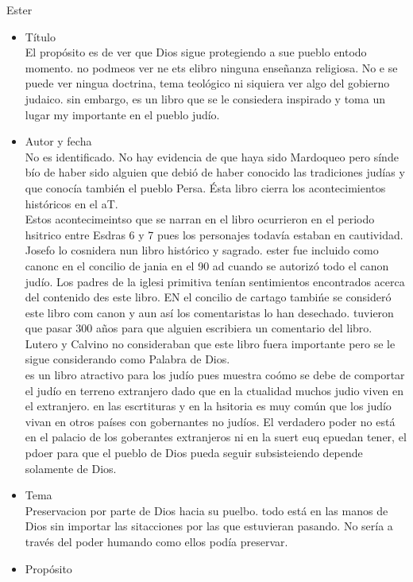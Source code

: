 \documentclass[12pt]{article}
\begin{document}
\begin{section}{Ester}
	\begin{itemize}
		\item Título\\
			El propósito es de ver que Dios sigue protegiendo a sue pueblo entodo momento. no podmeos ver ne ets elibro ninguna enseñanza religiosa. No e se puede ver ningua doctrina, tema teológico ni siquiera ver algo del gobierno judaico. sin embargo, es un libro que se le consiedera inspirado y toma un lugar my importante en el pueblo judío.
		\item Autor y fecha\\
			No es identificado. No hay evidencia de que haya sido Mardoqueo pero sínde bío de haber sido alguien que debió de haber conocido las tradiciones judías y que conocía también el pueblo Persa. Ésta libro cierra los acontecimientos históricos en el aT.\\
			Estos acontecimeintso que se narran en el libro ocurrieron en el periodo hsitrico entre Esdras 6 y 7 pues los personajes todavía estaban en cautividad. Josefo lo cosnidera nun libro histórico y sagrado. ester fue incluido como canonc en el concilio de jania en el 90 ad cuando se autorizó todo el canon judío. Los padres de la iglesi primitiva tenían sentimientos encontrados acerca del contenido des este libro. EN el concilio de cartago tambińe se consideró este libro com canon y aun así los comentaristas lo han desechado. tuvieron que pasar 300 años para que alguien escribiera un comentario del libro. Lutero y Calvino no consideraban que este libro fuera importante pero se le sigue considerando como Palabra de Dios.\\
			es un libro atractivo para los judío pues muestra coómo se debe de comportar el judío en terreno extranjero dado que en la ctualidad muchos judio viven en el extranjero. en las escrtituras y en la hsitoria es muy común que los judío vivan en otros países con gobernantes no judíos. El verdadero poder no está en el palacio de los goberantes extranjeros ni en la suert euq epuedan tener, el pdoer para que el pueblo de Dios pueda seguir subsisteiendo depende solamente de Dios.
		\item Tema\\
			Preservacion por parte de Dios hacia su puelbo. todo está en las manos de Dios sin importar las sitacciones por las que estuvieran pasando. No sería a través del poder humando como ellos podía preservar.
		\item Propósito\\

\end{itemize}
\end{section}
\end{document}
